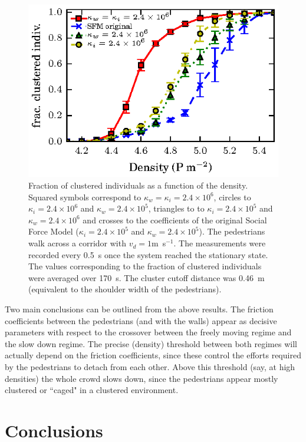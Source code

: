 \documentclass[preprint,12pt]{elsarticle}
\begin{document}
\begin{figure}[htbp!]
\centering
\includegraphics[width=0.7\columnwidth]
{./fracc_clusteriz_vs_density.eps}
\caption{\label{fic} Fraction of clustered individuals as a function of the density. Squared symbols correspond to $\kappa_w=\kappa_i=2.4\times 10^6$, circles to $\kappa_i=2.4\times 10^6$ and $\kappa_w=2.4\times 10^5$, triangles to to $\kappa_i=2.4\times 10^5$ and $\kappa_w=2.4\times 10^6$ and crosses to the coefficients of the original Social Force Model ($\kappa_i=2.4\times 10^5$ and $\kappa_w=2.4\times 10^5$). The pedestrians walk across a corridor with $v_d=1$m~s$^{-1}$. The measurements were recorded every 0.5~s once the system reached the stationary state. The values corresponding to the fraction of clustered individuals were averaged over 170~s. The cluster cutoff distance was 0.46~m (equivalent to the shoulder width of the pedestrians).}
\end{figure}

Two main conclusions can be outlined from the above
results. The friction coefficients between the pedestrians
(and with the walls) appear as decisive parameters
with respect to the crossover between the freely moving
regime and the slow down regime. The precise (density) threshold between both regimes will actually depend on
the friction coefficients, since these control the efforts
required by the pedestrians to detach from each other.
Above this threshold (say, at high densities) the whole
crowd slows down, since the pedestrians appear mostly
clustered or ``caged" in a clustered environment.\\

\section{\label{conclusions}Conclusions}
\end{document}
